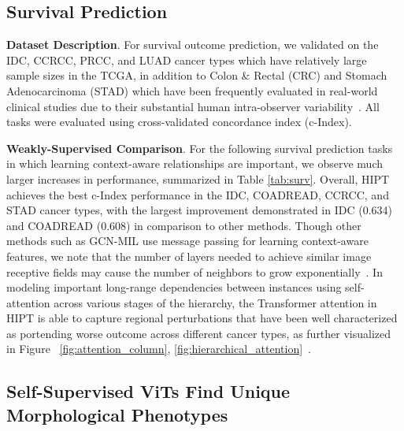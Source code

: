 {\subsection{Survival Prediction}

\textbf{Dataset Description}. For survival outcome prediction, we validated on the IDC, CCRCC, PRCC, and LUAD cancer types which have relatively large sample sizes in the TCGA, in addition to Colon \& Rectal (CRC) and Stomach Adenocarcinoma (STAD) which have been frequently evaluated in real-world clinical studies due to their substantial human intra-observer variability~\cite{echle2020bjc, wulczyn2021npj, skrede2020deep}. All tasks were evaluated using cross-validated concordance index (c-Index).

\textbf{Weakly-Supervised Comparison}. For the following survival prediction tasks in which learning context-aware relationships are important, we observe much larger increases in performance, summarized in Table \ref{tab:surv}. Overall, HIPT achieves the best c-Index performance in the IDC, COADREAD, CCRCC, and STAD cancer types, with the largest improvement demonstrated in IDC (0.634) and COADREAD (0.608) in comparison to other methods. Though other methods such as GCN-MIL use message passing for learning context-aware features, we note that the number of layers needed to achieve similar image receptive fields may cause the number of neighbors to grow exponentially~\cite{li2019deepgcns}. In modeling important long-range dependencies between instances using self-attention across various stages of the hierarchy, the Transformer attention in HIPT is able to capture regional perturbations that have been well characterized as portending worse outcome across different cancer types, as further visualized in Figure ~\ref{fig:attention_column}, \ref{fig:hierarchical_attention}~\cite{abduljabbar2020geospatial, wulczyn2020deep, wulczyn2021npj, skrede2020deep}. 

\subsection{Self-Supervised ViTs Find Unique Morphological Phenotypes}

}

